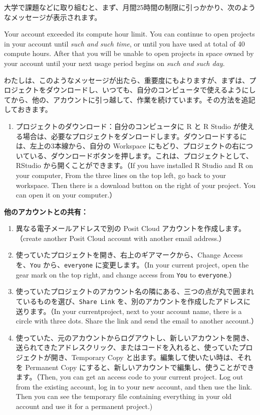 \documentclass[
]{bxjsbook}
\providecommand{\tightlist}{%
  \setlength{\itemsep}{0pt}\setlength{\parskip}{0pt}}
\theoremstyle{definition}
\theoremstyle{definition}
\theoremstyle{definition}
\theoremstyle{definition}
\theoremstyle{remark}
\begin{document}
大学で課題などに取り組むと、まず、月間25時間の制限に引っかかり、次のようなメッセージが表示されます。

Your account exceeded its compute hour limit. You can continue to open projects in your account until \emph{such and such time}, or until you have used at total of 40 compute hours. After that you will be unable to open projects in space owned by your account until your next usage period begins on \emph{such and such day}.

わたしは、このようなメッセージが出たら、重要度にもよりますが、まずは、プロジェクトをダウンロードし、いつても、自分のコンピュータで使えるようにしてから、他の、アカウントに引っ越して、作業を続けています。その方法を追記しておきます。

\begin{enumerate}
\def\labelenumi{\arabic{enumi}.}
\setcounter{enumi}{-1}
\tightlist
\item
  プロジェクトのダウンロード：自分のコンピュータに R と R Studio が使える場合は、必要なプロジェクトをダンロードします。ダウンロードするには、左上の3本線から、自分の Workspace にもどり、プロジェクトの右についている、ダウンロードボタンを押します。これは、プロジェクトとして、RStudio から開くことができます。（If you have installed R Studio and R on your computer, From the three lines on the top left, go back to your workspace.
  Then there is a download button on the right of your project. You can open it on your computer.）
\end{enumerate}

\textbf{他のアカウントとの共有：}

\begin{enumerate}
\def\labelenumi{\arabic{enumi}.}
\tightlist
\item
  異なる電子メールアドレスで別の Posit Cloud アカウントを作成します。（create another Posit Cloud account with another email address.）
\item
  使っていたプロジェクトを開き、右上のギアマークから、Change Access を、\texttt{You} から、\texttt{everyone} に変更します。（In your current project, open the gear mark on the top right, and change access from \texttt{You} to \texttt{everyone}.）
\item
  使っていたプロジェクトのアカウント名の隣にある、三つの点が丸で囲まれているものを選び、\texttt{Share\ Link} を、別のアカウントを作成したアドレスに送ります。（In your currentproject, next to your account name, there is a circle with three dots. Share the link and send the email to another account.）
\item
  使っていた、元のアカウントからログアウトし、新しいアカウントを開き、送られてきたアドレスクリック、またはコードを入れると、使っていたプロジェクトが開き、Temporary Copy と出ます。編集して使いたい時は、それを Permanent Copy にすると、新しいアカウントで編集し、使うことができます。（Then, you can get an access code to your current project. Log out from the existing account, log in to your new account, and then use the link.
  Then you can see the temporary file containing everything in your old account and use it for a permanent project.)
\end{enumerate}
\end{document}
